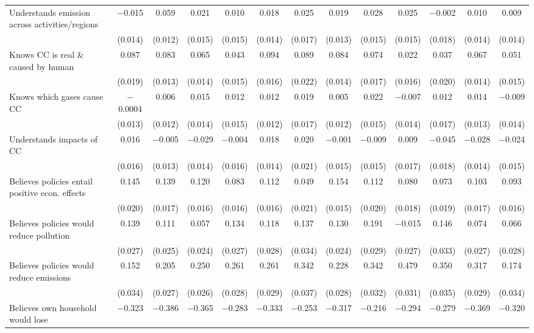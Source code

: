 \begin{tabular}{@{\extracolsep{5pt}}lcccccccccccc}
  Understands emission across activities/regions & $-$0.015 & 0.059 & 0.021 & 0.010 & 0.018 & 0.025 & 0.019 & 0.028 & 0.025 & $-$0.002 & 0.010 & 0.009 \\ 
  & (0.014) & (0.012) & (0.015) & (0.015) & (0.014) & (0.017) & (0.013) & (0.015) & (0.015) & (0.018) & (0.014) & (0.014) \\ 
  Knows CC is real \& caused by human & 0.087 & 0.083 & 0.065 & 0.043 & 0.094 & 0.089 & 0.084 & 0.074 & 0.022 & 0.037 & 0.067 & 0.051 \\ 
  & (0.019) & (0.013) & (0.014) & (0.015) & (0.016) & (0.022) & (0.014) & (0.017) & (0.016) & (0.020) & (0.014) & (0.015) \\ 
  Knows which gases cause CC & $-$0.0004 & 0.006 & 0.015 & 0.012 & 0.012 & 0.019 & 0.005 & 0.022 & $-$0.007 & 0.012 & 0.014 & $-$0.009 \\ 
  & (0.013) & (0.012) & (0.014) & (0.015) & (0.012) & (0.017) & (0.012) & (0.015) & (0.014) & (0.017) & (0.013) & (0.014) \\ 
  Understands impacts of CC & 0.016 & $-$0.005 & $-$0.029 & $-$0.004 & 0.018 & 0.020 & $-$0.001 & $-$0.009 & 0.009 & $-$0.045 & $-$0.028 & $-$0.024 \\ 
  & (0.016) & (0.013) & (0.014) & (0.016) & (0.014) & (0.021) & (0.015) & (0.015) & (0.017) & (0.018) & (0.014) & (0.015) \\ 
  Believes policies entail positive econ. effects & 0.145 & 0.139 & 0.120 & 0.083 & 0.112 & 0.049 & 0.154 & 0.112 & 0.080 & 0.073 & 0.103 & 0.093 \\ 
  & (0.020) & (0.017) & (0.016) & (0.016) & (0.016) & (0.021) & (0.015) & (0.020) & (0.018) & (0.019) & (0.017) & (0.016) \\ 
  Believes policies would reduce pollution & 0.139 & 0.111 & 0.057 & 0.134 & 0.118 & 0.137 & 0.130 & 0.191 & $-$0.015 & 0.146 & 0.074 & 0.066 \\ 
  & (0.027) & (0.025) & (0.024) & (0.027) & (0.028) & (0.034) & (0.024) & (0.029) & (0.027) & (0.033) & (0.027) & (0.028) \\ 
  Believes policies would reduce emissions & 0.152 & 0.205 & 0.250 & 0.261 & 0.261 & 0.342 & 0.228 & 0.342 & 0.479 & 0.350 & 0.317 & 0.174 \\ 
  & (0.034) & (0.027) & (0.026) & (0.028) & (0.029) & (0.037) & (0.028) & (0.032) & (0.031) & (0.035) & (0.029) & (0.034) \\ 
  Believes own household would lose & $-$0.323 & $-$0.386 & $-$0.365 & $-$0.283 & $-$0.333 & $-$0.253 & $-$0.317 & $-$0.216 & $-$0.294 & $-$0.279 & $-$0.369 & $-$0.320 \\ 

\end{tabular}
